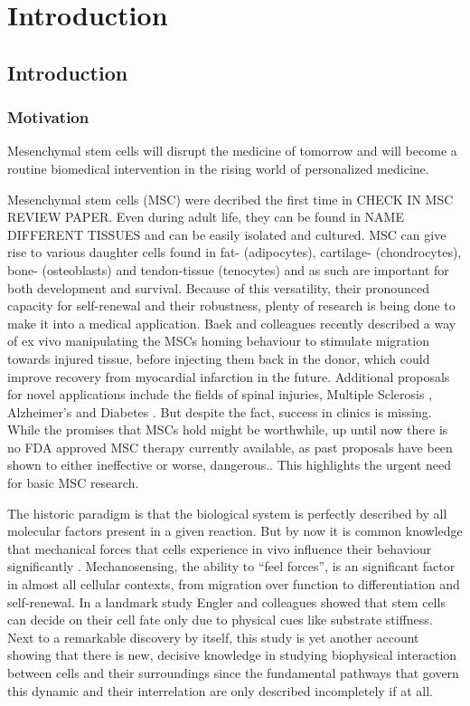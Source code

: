 \chapter{Introduction}

\section{Introduction}
\subsection{Motivation}
\label{sec:motivation}
Mesenchymal stem cells will disrupt the medicine of tomorrow and will become a routine biomedical intervention in the rising world of personalized medicine. 

Mesenchymal stem cells (MSC) were decribed the first time in CHECK IN MSC REVIEW PAPER. Even during adult life, they can be found in NAME DIFFERENT TISSUES and can be easily isolated and cultured. MSC can give rise to various daughter cells found in fat- (adipocytes), cartilage- (chondrocytes), bone- (osteoblasts) and tendon-tissue (tenocytes) \cite{Barlow2008, Hass2011} and as such are important for both development and survival. Because of this versatility, their pronounced capacity for self-renewal and their robustness, plenty of research is being done to make it into a medical application. Baek and colleagues recently described a way of ex vivo manipulating the MSCs homing behaviour to stimulate migration towards injured tissue, before injecting them back in the donor, which could improve recovery from myocardial infarction in the future. \cite{Baek2011}  Additional proposals for novel applications include the fields of spinal injuries\cite{Goldschlager2010}, Multiple Sclerosis \cite{Planchon2018}, Alzheimer's \cite{Han2018, Hao2012} and Diabetes \cite{Evangelista2018}. But despite the fact, success in clinics is missing. While the promises that MSCs hold might be worthwhile, up until now there is no FDA approved MSC therapy currently available, as past proposals have been shown to either ineffective or worse, dangerous.\cite{Amariglio2009}. This highlights the urgent need for basic MSC research.\par

The historic paradigm is that the biological system is perfectly described by all molecular factors present in a given reaction. But by now it is common knowledge that mechanical forces that cells experience in vivo influence their behaviour significantly \cite{Hao2015}. Mechanosensing, the ability to “feel forces”, is an significant factor in almost all cellular contexts, from migration over function to differentiation and self-renewal.  
In a landmark study Engler and colleagues \cite{Engler2006} showed that stem cells can decide on their cell fate only due to physical cues like substrate stiffness. Next to a remarkable discovery by itself, this study is yet another account showing that there is new, decisive knowledge in studying biophysical interaction between cells and their surroundings since the fundamental pathways that govern this dynamic and their interrelation are only described incompletely if at all. 

